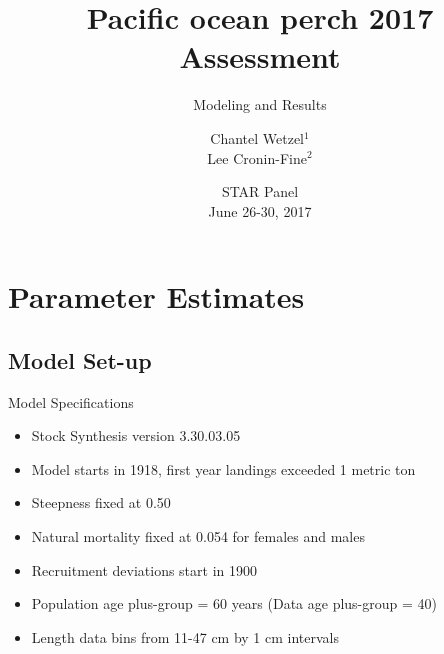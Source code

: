 \documentclass[pdf]{beamer}\usepackage[]{graphicx}\usepackage[]{color}
\title{Pacific ocean perch 2017 Assessment}
\subtitle{Modeling and Results}
\author{Chantel Wetzel$^{1}$\\
        Lee Cronin-Fine$^{2}$}
\institute[NWFSC]{
Northwest Fisheries Science Center$^1$ \\
University of Washington$^2$ \\
\medskip
}
\date{{\footnotesize STAR Panel \\ June 26-30, 2017}}
\begin{document}
\begin{frame}
  \titlepage
\end{frame}


\section{Parameter Estimates}
\subsection{Model Set-up}
\begin{frame}{Model Specifications}
  \begin{itemize}
    \item Stock Synthesis version 3.30.03.05
    \item Model starts in 1918, first year landings exceeded 1 metric ton
    \item Steepness fixed at 0.50
    \item Natural mortality fixed at 0.054 for females and males
    \item Recruitment deviations start in 1900
    \item Population age plus-group = 60 years (Data age plus-group = 40)
    \item Length data bins from 11-47 cm by 1 cm intervals
  \end{itemize}
\end{frame}
  
\end{document}
